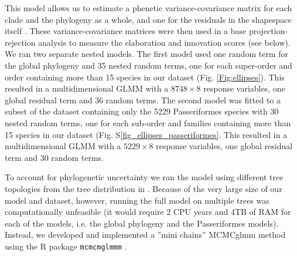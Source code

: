 \documentclass[12pt,letterpaper]{article}
\begin{document}
This model allows us to estimate a phenetic variance-covariance matrix for each clade and the phylogeny as a whole, and one for the residuals in the shapespace itself \cite{robinson2013quantifying}.
These variance-covariance matrices were then used in a base projection-rejection analysis to measure the elaboration and innovation scores (see below).
We ran two separate nested models.
The first model used one random term for the global phylogeny and 35 nested random terms, one for each super-order and order containing more than 15 species in our dataset (Fig. \ref{Fig:ellipses}).
This resulted in a multidimensional GLMM with a $8748 \times 8$ response variables, one global residual term and 36 random terms.
The second model was fitted to a subset of the dataset containing only the 5229 Passeriformes species with 30 nested random terms, one for each sub-order and families containing more than 15 species in our dataset (Fig. S\ref{fig_ellipses_passeriformes}.
This resulted in a multidimensional GLMM with a $5229 \times 8$ response variables, one global residual term and 30 random terms.
 
To account for phylogenetic uncertainty we ran the model using different tree topologies from the tree distribution in \cite{jetz2012global}.
Because of the very large size of our model and dataset, however, running the full model on multiple trees was computationally unfeasible (it would require 2 CPU years and 4TB of RAM for each of the models, i.e. the global phylogeny and the Passeriformes models).
Instead, we developed and implemented a ''mini chains'' MCMCglmm method using the R package \texttt{mcmcmglmmm} \cite{mcmcmcglmmm}.
\end{document}
